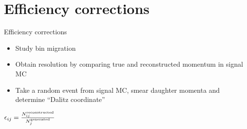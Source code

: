 \documentclass{beamer}
\begin{document}
\section{Efficiency corrections}
\begin{frame}{Efficiency corrections}
  \begin{itemize}
    \setlength\itemsep{1.5em}
    \item{Study bin migration}
    \item{Obtain resolution by comparing true and reconstructed momentum in signal MC}
    \item{Take a random event from signal MC, smear daughter momenta and determine ``Dalitz coordinate''}
  \end{itemize}
  \vspace{0.3cm}
  \begin{center}
    $\epsilon_{ij} = \frac{N^{\rm reconstructed}_{ij}}{N^{\rm generated}_j}$
  \end{center}
\end{frame}
\end{document}

